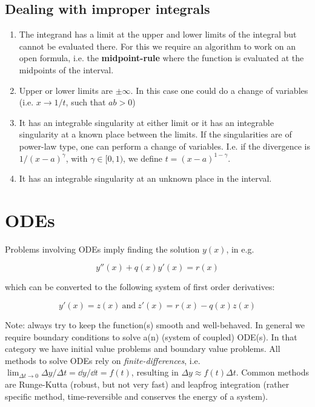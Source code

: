 \documentclass[a4paper]{article}
\begin{document}
\subsection{Dealing with improper integrals}

\begin{enumerate}
    \item The integrand has a limit at the upper and lower limits of the integral but cannot be evaluated there. For this we require an algorithm to work on an open formula, i.e. the \textbf{midpoint-rule} where the function is evaluated at the midpoints of the interval.
    \item Upper or lower limits are $\pm\infty$. In this case one could do a change of variables (i.e. $x\rightarrow 1/t$, such that $ab>0$)
    \item It has an integrable singularity at either limit or it has an integrable singularity at a known place between the limits. If the singularities are of power-law type, one can perform a change of variables. I.e. if the divergence is $1/(x-a)^\gamma$, with $\gamma\in[0,1)$, we define $t=(x-a)^{1-\gamma}$.
    \item It has an integrable singularity at an unknown place in the interval.
\end{enumerate}

\section{ODEs}

Problems involving ODEs imply finding the solution $y(x)$, in e.g.

\begin{equation*}
    y''(x)+q(x)y'(x)=r(x)
\end{equation*}

which can be converted to the following system of first order derivatives:

\begin{equation*}
    y'(x)=z(x)\ \text{and}\ z'(x)=r(x)-q(x)z(x)
\end{equation*}

Note: always try to keep the function(s) smooth and well-behaved. In general we require boundary conditions to solve a(n) (system of coupled) ODE(s).  In that category we have initial value problems and boundary value problems. All methods to solve ODEs rely on \textit{finite-differences}, i.e. $\lim_{\Delta t\rightarrow 0}\Delta y/\Delta t=\dd{y}/\dd{t}=f(t)$, resulting in $\Delta y\approx f(t)\Delta t$. Common methods are Runge-Kutta (robust, but not very fast) and leapfrog integration (rather specific method, time-reversible and conserves the energy of a system).
\end{document}
